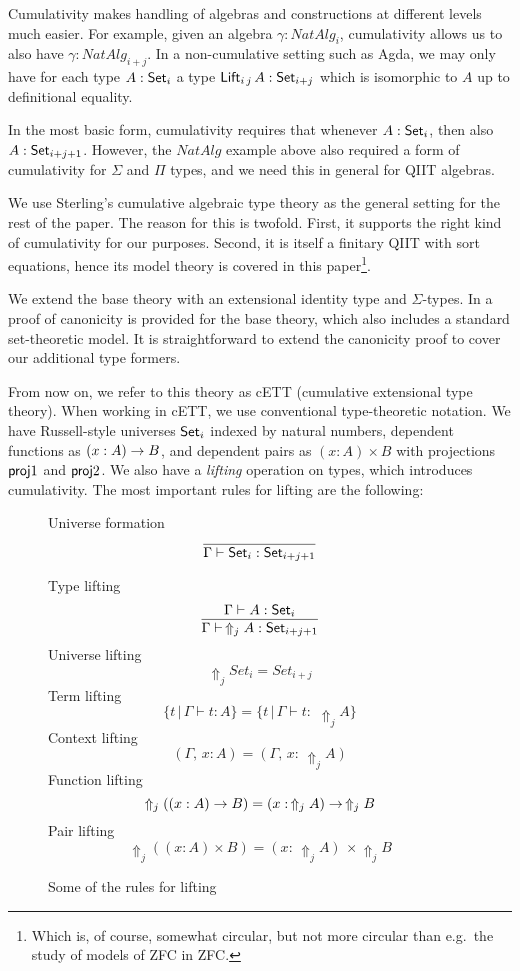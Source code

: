 \documentclass{llncs}
\newcommand{\Lift}{\Uparrow}
\begin{document}
Cumulativity makes handling of algebras and constructions at different levels
much easier. For example, given an algebra $\gamma : NatAlg_i$, cumulativity
allows us to also have $\gamma : NatAlg_{i+j}$. In a non-cumulative setting such
as Agda, we may only have for each type $A : \mathsf{Set}_i$ a type $\mathsf{Lift}_{i\,j}\,A :
\mathsf{Set}_{i+j}$ which is isomorphic to $A$ up to definitional equality.

In the most basic form, cumulativity requires that whenever $A : \mathsf{Set}_i$, then
also $A : \mathsf{Set}_{i+j+1}$. However, the $NatAlg$ example above also required a form
of cumulativity for $\Sigma$ and $\Pi$ types, and we need this in general for
QIIT algebras.

We use Sterling's cumulative algebraic type theory \cite{TODO} as the general
setting for the rest of the paper. The reason for this is twofold. First, it
supports the right kind of cumulativity for our purposes. Second, it is itself a
finitary QIIT with sort equations, hence its model theory is covered in this
paper\footnote{Which is, of course, somewhat circular, but not more circular than
  e.g.\ the study of models of ZFC in ZFC.}.

We extend the base theory with an extensional identity type and
$\Sigma$-types. In \cite{TODO} a proof of canonicity is provided for the base
theory, which also includes a standard set-theoretic model. It is
straightforward to extend the canonicity proof to cover our additional type
formers.

From now on, we refer to this theory as cETT (cumulative extensional type
theory). When working in cETT, we use conventional type-theoretic notation. We
have Russell-style universes $\mathsf{Set}_i$ indexed by natural numbers, dependent
functions as $(x : A)\rightarrow B$, and dependent pairs as $(x : A)\times B$ with
projections $\mathsf{proj}1$ and $\mathsf{proj}2$. We also have a \emph{lifting} operation on
types, which introduces cumulativity. The most important rules for lifting are
the following:

\begin{figure}

Universe formation
\[
  \infer{\Gamma \vdash \Set_i : \Set_{i+j+1}}{}
\]

Type lifting
\[
  \infer{\Gamma \vdash\,\Lift_j A : \Set_{i+j+1}}
        {\Gamma \vdash A : \Set_i}
\]
Universe lifting
\[
  \Lift_j Set_i = Set_{i+j}
\]
Term lifting
\[
\{t\,|\,\Gamma \vdash t : A\} = \{t\,|\,\Gamma \vdash t :\,\,\Lift_j A\}
\]
Context lifting
\[
(\Gamma,\,x : A) = (\Gamma,\,x :\,\Lift_j A)
\]
Function lifting
\[
\Lift_j((x : A)\ra B) = (x :\,\Lift_j A)\ra\,\Lift_j B
\]
Pair lifting
\[
\Lift_j((x : A)\times B) = (x :\,\Lift_j A)\,\times\Lift_j B
\]

\caption{Some of the rules for lifting}
\label{lifting}
\end{figure}
\end{document}
